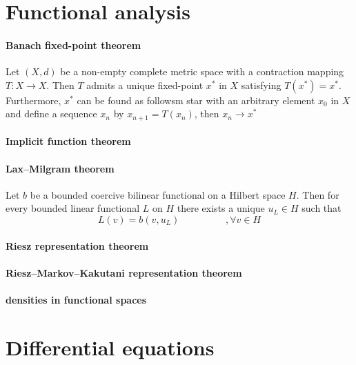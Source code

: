 \documentclass[a4paper,10pt]{article}
\begin{document}
\section{Functional analysis}
\paragraph{Banach fixed-point theorem}
Let $(X,d)$ be a non-empty complete metric space with a contraction mapping $T:X\longrightarrow X$. Then $T$ admits a unique fixed-point $x^{*}$ in $X$ satisfying $T(x^{*}) = x^{*}$. Furthermore, $x^{*}$ can be found as followsm star with an arbitrary element $x_0$ in $X$ and define a sequence ${x_n}$ by $x_{n+1}=T(x_n)$, then $x_n \longrightarrow x^*$

\paragraph{Implicit function theorem}

\paragraph{Lax–Milgram theorem} Let $b$ be a bounded coercive bilinear functional on a Hilbert space $H$. Then for every bounded linear functional $L$ on $H$ there exists a unique $u_{L} \in H$ such that 
\[
L(v) = b(v,u_{L}) \hspace{2cm} ,\forall v \in H
\]

\paragraph{Riesz representation theorem}
\paragraph{Riesz–Markov–Kakutani representation theorem}
\paragraph{densities in functional spaces}

\section{Differential equations}
\end{document}
